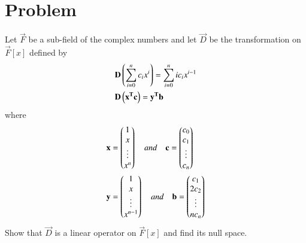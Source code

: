 \documentclass[journal,12pt,twocolumn]{IEEEtran}
\begin{document}
\section{Problem}
Let $\vec{F}$ be a sub-field of the complex numbers and let $\vec{D}$ be the transformation on $\vec{F}[x]$ defined by
\begin{align}
& \mathbf{D}\left(\sum_{i=0}^{n}c_ix^{i}\right) = \sum_{i=0}^{n}ic_ix^{i-1} \label{1} \\
& \mathbf{D}\left(\mathbf{x^Tc}\right) = \mathbf{y^{T}b}
\end{align}
where
\begin{align}
& \mathbf{x} = \begin{pmatrix}1 \\ x \\ \vdots \\ x^n\end{pmatrix} \quad and \quad \mathbf{c} =\begin{pmatrix}c_0 \\ c_1 \\ \vdots \\ c_n\end{pmatrix} \\
& \mathbf{y} = \begin{pmatrix}1 \\ x \\ \vdots \\ x^{n-1}\end{pmatrix} \quad and \quad  \mathbf{b} = \begin{pmatrix}c_1 \\ 2c_2 \\ \vdots \\ nc_n\end{pmatrix}
\end{align}
Show that $\vec{D}$ is a linear operator on $\vec{F}[x]$ and find its null space.
\end{document}
